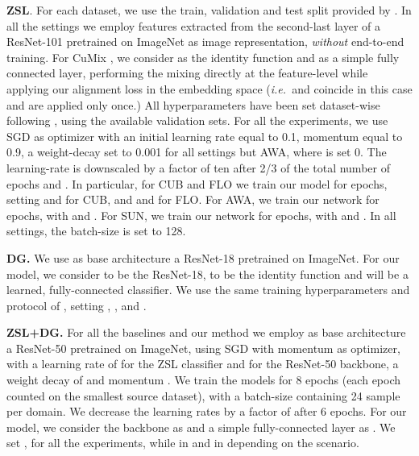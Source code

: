 \documentclass[runningheads]{llncs}
\newcommand{\ie}{\emph{i.e.~}}
\newcommand{\myparagraph}[1]{\noindent\textbf{#1}}
\newcommand{\methodName}{{CuMix} }
\begin{document}
\myparagraph{ZSL}. For each dataset, we use the train, validation and test split provided by \cite{xian2018zeroshotgood}. In all the settings we employ features extracted from the second-last layer of a ResNet-101 \cite{he2016deep} pretrained on ImageNet as image representation, \textit{without} end-to-end training. For \methodName, we consider  as the identity function and as  a simple fully connected layer, performing the mixing directly at the feature-level while applying our alignment loss in the embedding space (\ie  and  coincide in this case and are applied only once.) All hyperparameters have been set dataset-wise following \cite{xian2018zeroshotgood}, using the available validation sets. For all the experiments, we use SGD as optimizer with an initial learning rate equal to 0.1, momentum equal to 0.9, a weight-decay set to 0.001 for all settings but AWA, where is set 0. The learning-rate is downscaled by a factor of ten after 2/3 of the total number of epochs and . In particular, for CUB and FLO we train our model for  epochs, setting  and  for CUB, and  and  for FLO. For AWA, we train our network for  epochs, with  and . For SUN, we train our network for  epochs, with  and . In all settings, the batch-size is set to 128.

\myparagraph{DG.}  We use as base architecture a ResNet-18 \cite{he2016deep} pretrained on ImageNet. For our model, we consider  to be the ResNet-18,  to be the identity function and  will be a learned, fully-connected classifier. We use the same training hyperparameters and protocol of \cite{li2019episodic}, setting , ,  and .

\myparagraph{ZSL+DG.} For all the baselines and our method we employ as base architecture a ResNet-50 \cite{he2016deep} pretrained on ImageNet, using SGD with momentum as optimizer, with a learning rate of  for the ZSL classifier and  for the ResNet-50 backbone, a weight decay of  and momentum . We train the models for 8 epochs (each epoch counted on the smallest source dataset), with a batch-size containing 24 sample per domain. We decrease the learning rates by a factor of  after 6 epochs. For our model, we consider the backbone as  and a simple fully-connected layer as . We set ,  for all the experiments, while  in  and  in  depending on the scenario.






 
\end{document}
